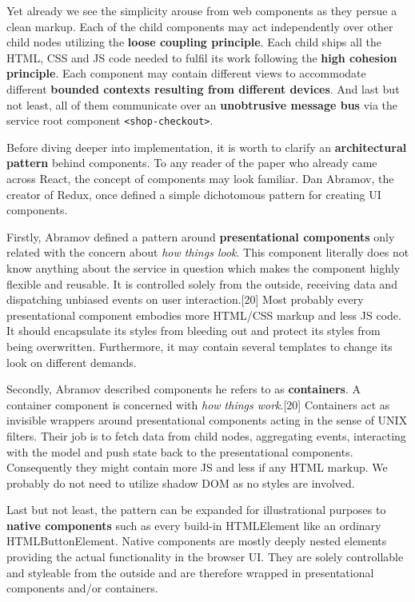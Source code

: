 \documentclass[]{article}
\begin{document}
Yet already we see the simplicity arouse from web components as they
persue a clean markup. Each of the child components may act
independently over other child nodes utilizing the \textbf{loose
coupling principle}. Each child ships all the HTML, CSS and JS code
needed to fulfil its work following the \textbf{high cohesion
principle}. Each component may contain different views to accommodate
different \textbf{bounded contexts resulting from different devices}.
And last but not least, all of them communicate over an
\textbf{unobtrusive message bus} via the service root component
\texttt{\textless{}shop-checkout\textgreater{}}.

Before diving deeper into implementation, it is worth to clarify an
\textbf{architectural pattern} behind components. To any reader of the
paper who already came across React, the concept of components may look
familiar. Dan Abramov, the creator of Redux, once defined a simple
dichotomous pattern for creating UI components.

Firstly, Abramov defined a pattern around \textbf{presentational
components} only related with the concern about \emph{how things look}.
This component literally does not know anything about the service in
question which makes the component highly flexible and reusable. It is
controlled solely from the outside, receiving data and dispatching
unbiased events on user interaction.{[}20{]} Most probably every
presentational component embodies more HTML/CSS markup and less JS code.
It should encapsulate its styles from bleeding out and protect its
styles from being overwritten. Furthermore, it may contain several
templates to change its look on different demands.

Secondly, Abramov described components he refers to as
\textbf{containers}. A container component is concerned with \emph{how
things work}.{[}20{]} Containers act as invisible wrappers around
presentational components acting in the sense of UNIX filters. Their job
is to fetch data from child nodes, aggregating events, interacting with
the model and push state back to the presentational components.
Consequently they might contain more JS and less if any HTML markup. We
probably do not need to utilize shadow DOM as no styles are involved.

Last but not least, the pattern can be expanded for illustrational
purposes to \textbf{native components} such as every build-in
HTMLElement like an ordinary HTMLButtonElement. Native components are
mostly deeply nested elements providing the actual functionality in the
browser UI. They are solely controllable and styleable from the outside
and are therefore wrapped in presentational components and/or
containers.
\end{document}
